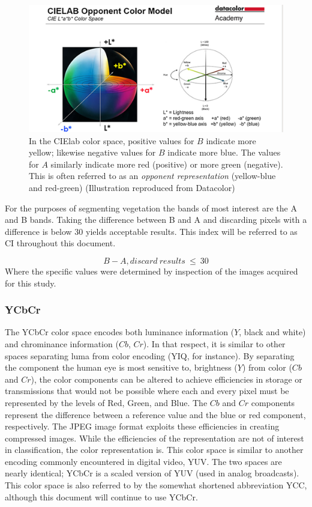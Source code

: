 \documentclass[letterpaper, notitlepage]{report}
\begin{document}
{\begin{figure}[H]
	\centering
	\includegraphics[width=.65\linewidth]{./figures/cielab-colorspace.png}
	\caption[CIElab color space]{In the CIElab color space, positive values for $B$ indicate more yellow; likewise negative values for $B$ indicate more blue. The values for $A$ similarly indicate more red (positive) or more green (negative). This is often referred to as an \textit{opponent representation} (yellow-blue and red-green) (Illustration reproduced from Datacolor)}
	\label{fig:cielab}	
\end{figure}

 For the purposes of segmenting vegetation the bands of  most interest are the A and B bands. Taking the difference between B and A and discarding pixels with a difference is below 30 yields acceptable results. This index will be referred to as CI throughout this document.

\begin{equation}\label{eqn:index-cielab}
		B - A, discard~results~\leq~30
\end{equation}
Where the specific values were determined by inspection of the images acquired for this study.

\subsubsection{YCbCr}
\label{section:ycbcri}
The YCbCr color space encodes both luminance information ($Y$, black and white) and chrominance information ($Cb$, $Cr$). In that respect, it is similar to other spaces separating luma from color encoding (YIQ, for instance). By separating the component the human eye is most sensitive to, brightness ($Y$) from color ($Cb$ and $Cr$), the color components can be altered to achieve efficiencies in storage or transmissions that would not be possible where each and every pixel must be represented by the levels of Red, Green, and Blue.  The $Cb$ and $Cr$ components represent the difference between a reference value and the blue or red component, respectively. The JPEG image format exploits these efficiencies in creating compressed images. While the efficiencies of the representation are not of interest in classification, the color representation is. This color space is similar to another encoding commonly encountered in digital video, YUV. The two spaces are nearly identical; YCbCr is a scaled version of YUV (used in analog broadcasts). This color space is also referred to by the somewhat shortened abbreviation YCC, although this document will continue to use YCbCr.

}
\end{document}

